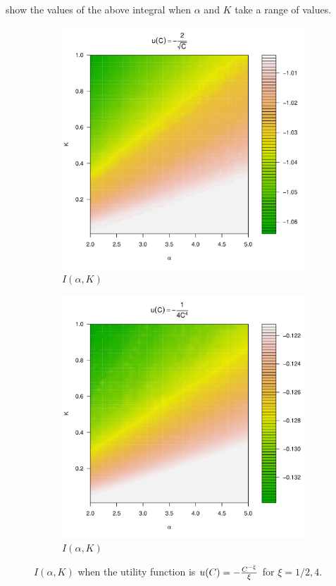 \documentclass{article}
\newcommand{\1}[1]{
  \mathbf{1}_{\{#1\}}
}
\begin{document}
show the values of the above integral when $\alpha$ and $K$ take
a range of values.
\begin{figure}[htb!]
  \begin{subfigure}[b]{0.5\linewidth}
    \includegraphics[width=\textwidth]{preference_pareto5e-1.pdf}
    \caption{$I(\alpha, K)$}
    \label{fig:preference_pareto5e-1}
  \end{subfigure}
  \begin{subfigure}[b]{0.5\linewidth}
    \includegraphics[width=\textwidth]{preference_pareto4.pdf}
    \caption{$I(\alpha, K)$}
    \label{fig:preference_pareto4}
  \end{subfigure}
  \caption{$I(\alpha, K)$ when the utility function is
    $u(C) = -{C^{-\xi} \over \xi}$ for $\xi = 1/2, 4$.
  }
\end{figure}
\end{document}
